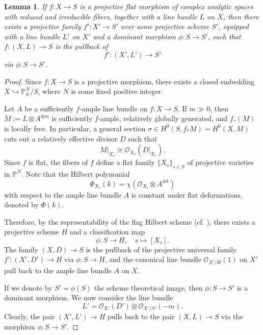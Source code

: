 \documentclass[12pt]{amsart}
\numberwithin{equation}{section}
\newtheorem{lemma}  [theorem]     {Lemma}
\theoremstyle{definition}
\theoremstyle{plain}
\newtheorem*{thm A*}{Theorem A}
\newtheorem*{thm B*}{Theorem B}
\newtheorem*{thm C*}{Theorem C}
\newtheorem*{thm D*}{Theorem D}
\theoremstyle{definition}
\renewcommand{\1}{\mathds{1}}
\renewcommand{\>}{\rightarrow}
\begin{document}
\begin{lemma}\label{Hilbertscheme}
If $ f : X \to S $ is a projective flat morphism of complex analytic spaces with reduced and irreducible fibers, together with a line bundle $ L $ on $ X $, then there exists a projective family $f' : X' \to S'$ over some projective scheme $ S' $, equipped with a line bundle $ L' $ on $ X' $ and a dominant morphism $ \phi : S \to S' $, such that $f : (X, L) \to S$ is the pullback of
\[
f' : (X', L') \to S'
\]
via $ \phi : S \to S' $.
\end{lemma}
\begin{proof}
Since $f: X \to S$ is a projective morphism, there exists a closed embedding 
$X \hookrightarrow \mathbb{P}_S^N / S$, where $N$ is some fixed positive integer. 

Let $A$ be a sufficiently $f$-ample line bundle on $f \colon X \to S$. 
If $m \gg 0$, then $M := L \otimes A^{\otimes m}$
is sufficiently $f$-ample, relatively globally generated, and $f_*(M)$ is locally free. 
In particular, a general section $\sigma \in H^0(S, f_*M) = H^0(X, M)$ cuts out a relatively effective divisor $D$ such that 
\[
M|_{X_s} \cong \mathcal{O}_{X_s}(D|_{X_s}).
\]
Since $f$ is flat, the fibers of $f$ define a flat family $
\{X_s\}_{s \in S}$ of projective varieties in $\mathbb{P}^N$. 
Note that the Hilbert polynomial 
\[
\Phi_{X_s}(k) = \chi\!\left(\mathcal{O}_{X_s} \otimes A^{\otimes k}\right)
\]
with respect to the ample line bundle $A$ is constant under flat deformations, denoted by $\Phi(k)$.

Therefore, by the representability of the flag Hilbert scheme (cf. \cite[Theorem 4.5.1]{Sernesi}), there exists a projective scheme $H$ and a classification map 
\[
\phi: S \to H, \quad s \mapsto [X_s].
\]
The family $(X,D) \to S$ is the pullback of the projective universal family $f': (X', D')\to H$ via $\phi:S\to H$, and the canonical line bundle $\mathcal{O}_{X'/H}(1)$ on $X'$ pull back to the ample line bundle $A$ on $X$. 

If we denote by $S' = \phi(S)$ the scheme theoretical image, then $\phi:S \to S'$ is a dominant morphism. 
We now consider the line bundle
\[
L' = \mathcal{O}_{X'}({D}') \otimes \mathcal{O}_{X'/S'}(-m).
\]
Clearly, the pair $(X', L') \to H$ pulls back to the pair $(X, L) \to S$ via the morphism $\phi : S \to S'.$ 
\end{proof}
\end{document}
